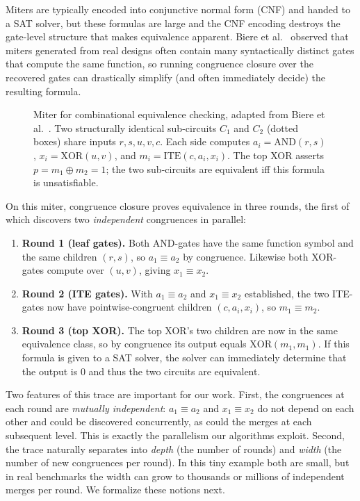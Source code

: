 Miters are typically encoded into conjunctive normal form (CNF) and handed
to a SAT solver, but these formulas are large and the CNF encoding
destroys the gate-level structure that makes equivalence apparent. Biere
et al.~\cite{clausal-cc} observed that miters generated from real designs
often contain many syntactically distinct gates that compute the same
function, so running congruence closure over the recovered gates can
drastically simplify (and often immediately decide) the resulting formula.

\begin{figure}[t]
\centering

\caption{Miter for combinational equivalence checking, adapted from
Biere et al.~\cite{clausal-cc}. Two structurally identical sub-circuits
$C_1$ and $C_2$ (dotted boxes) share inputs $r, s, u, v, c$. Each side
computes $a_i = \mathrm{AND}(r, s)$, $x_i = \mathrm{XOR}(u, v)$, and
$m_i = \mathrm{ITE}(c, a_i, x_i)$. The top XOR asserts $p = m_1 \oplus
m_2 = 1$; the two sub-circuits are equivalent iff this formula is
unsatisfiable.}
\label{fig:miter}
\end{figure}

On this miter, congruence closure proves equivalence in three rounds,
the first of which discovers two \emph{independent} congruences in parallel:

\begin{enumerate}
\item \textbf{Round 1 (leaf gates).} Both AND-gates have the same function
symbol and the same children $(r, s)$, so $a_1 \equiv a_2$ by congruence.
Likewise both XOR-gates compute over $(u, v)$, giving $x_1 \equiv x_2$.
\item \textbf{Round 2 (ITE gates).} With $a_1 \equiv a_2$ and $x_1 \equiv
x_2$ established, the two ITE-gates now have pointwise-congruent children
$(c, a_i, x_i)$, so $m_1 \equiv m_2$.
\item \textbf{Round 3 (top XOR).} The top XOR's two children are now in
the same equivalence class, so by congruence its output equals
$\mathrm{XOR}(m_1, m_1)$. If this formula is given to a SAT solver, 
the solver can immediately determine that the output is $0$ and thus the two 
circuits are equivalent. 
\end{enumerate}

Two features of this trace are important for our work. First, the
congruences at each round are \emph{mutually independent}: $a_1 \equiv
a_2$ and $x_1 \equiv x_2$ do not depend on each other and could be
discovered concurrently, as could the merges at each subsequent level.
This is exactly the parallelism our algorithms exploit. Second, the trace
naturally separates into \emph{depth} (the number of rounds) and
\emph{width} (the number of new congruences per round). In this tiny
example both are small, but in real benchmarks the width can grow
to thousands or millions of independent merges per round. We formalize
these notions next.

